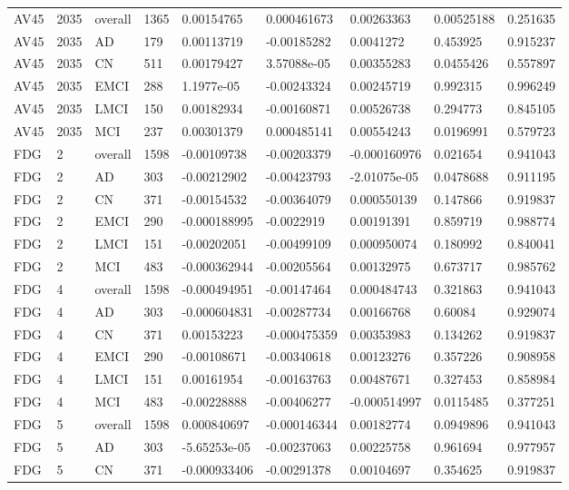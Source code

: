 \begin{landscape}
\begin{longtable}{lllllllll}
AV45 & 2035 & overall & 1365 & 0.00154765 & 0.000461673 & 0.00263363 & 0.00525188 & 0.251635 \\
AV45 & 2035 & AD & 179 & 0.00113719 & -0.00185282 & 0.0041272 & 0.453925 & 0.915237 \\
AV45 & 2035 & CN & 511 & 0.00179427 & 3.57088e-05 & 0.00355283 & 0.0455426 & 0.557897 \\
AV45 & 2035 & EMCI & 288 & 1.1977e-05 & -0.00243324 & 0.00245719 & 0.992315 & 0.996249 \\
AV45 & 2035 & LMCI & 150 & 0.00182934 & -0.00160871 & 0.00526738 & 0.294773 & 0.845105 \\
AV45 & 2035 & MCI & 237 & 0.00301379 & 0.000485141 & 0.00554243 & 0.0196991 & 0.579723 \\
FDG & 2 & overall & 1598 & -0.00109738 & -0.00203379 & -0.000160976 & 0.021654 & 0.941043 \\
FDG & 2 & AD & 303 & -0.00212902 & -0.00423793 & -2.01075e-05 & 0.0478688 & 0.911195 \\
FDG & 2 & CN & 371 & -0.00154532 & -0.00364079 & 0.000550139 & 0.147866 & 0.919837 \\
FDG & 2 & EMCI & 290 & -0.000188995 & -0.0022919 & 0.00191391 & 0.859719 & 0.988774 \\
FDG & 2 & LMCI & 151 & -0.00202051 & -0.00499109 & 0.000950074 & 0.180992 & 0.840041 \\
FDG & 2 & MCI & 483 & -0.000362944 & -0.00205564 & 0.00132975 & 0.673717 & 0.985762 \\
FDG & 4 & overall & 1598 & -0.000494951 & -0.00147464 & 0.000484743 & 0.321863 & 0.941043 \\
FDG & 4 & AD & 303 & -0.000604831 & -0.00287734 & 0.00166768 & 0.60084 & 0.929074 \\
FDG & 4 & CN & 371 & 0.00153223 & -0.000475359 & 0.00353983 & 0.134262 & 0.919837 \\
FDG & 4 & EMCI & 290 & -0.00108671 & -0.00340618 & 0.00123276 & 0.357226 & 0.908958 \\
FDG & 4 & LMCI & 151 & 0.00161954 & -0.00163763 & 0.00487671 & 0.327453 & 0.858984 \\
FDG & 4 & MCI & 483 & -0.00228888 & -0.00406277 & -0.000514997 & 0.0115485 & 0.377251 \\
FDG & 5 & overall & 1598 & 0.000840697 & -0.000146344 & 0.00182774 & 0.0949896 & 0.941043 \\
FDG & 5 & AD & 303 & -5.65253e-05 & -0.00237063 & 0.00225758 & 0.961694 & 0.977957 \\
FDG & 5 & CN & 371 & -0.000933406 & -0.00291378 & 0.00104697 & 0.354625 & 0.919837 \\

\end{longtable}
\end{landscape}
